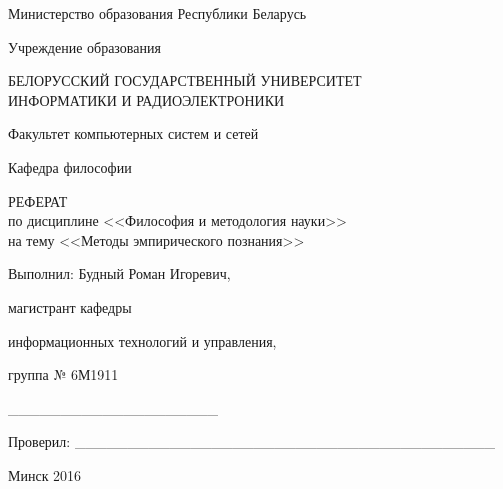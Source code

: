 \begin{titlepage}
\thispagestyle{empty}
\setlength{\parindent}{0cm} %

{\centering{}
  Министерство образования Республики Беларусь

  \smallskip
  Учреждение образования

  БЕЛОРУССКИЙ ГОСУДАРСТВЕННЫЙ УНИВЕРСИТЕТ \\
  ИНФОРМАТИКИ И РАДИОЭЛЕКТРОНИКИ

  \smallskip
  Факультет компьютерных систем и сетей

  \smallskip
  Кафедра философии\par
}

\vspace{30mm}

{\centering{}
  РЕФЕРАТ \\
  по дисциплине <<Философия и методология науки>> \\
  на тему <<Методы эмпирического познания>>\par
}

\vspace{30mm}

\begin{minipage}{.1\linewidth}
\end{minipage}
\hfill
\begin{minipage}{.8\linewidth}
  Выполнил: Будный Роман Игоревич,

  \hspace{2.4cm} магистрант кафедры

  \hspace{2.4cm} информационных технологий и управления,

  \hspace{2.4cm} группа № 6М1911

  \hspace{2.4cm} \_\_\_\_\_\_\_\_\_\_\_\_\_\_\_\_\_\_\_\_

  \smallskip
  Проверил: \;\_\_\_\_\_\_\_\_\_\_\_\_\_\_\_\_\_\_\_\_\_\_\_\_\_\_\_\_\_\_\_\_\_\_\_\_\_\_\_\_
\end{minipage}

\vfill
{\centering{}
  Минск 2016\par
}

\setlength{\parindent}{1.25cm} %
\end{titlepage}
